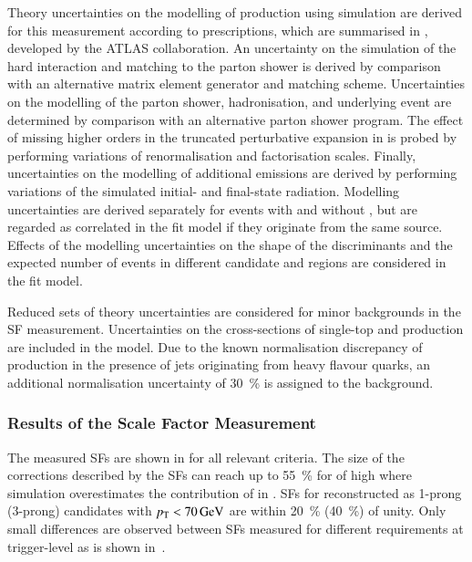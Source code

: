 Theory uncertainties on the modelling of \ttbar production using simulation are
derived for this measurement according to prescriptions, which are summarised in
, developed by the ATLAS collaboration. An
uncertainty on the simulation of the hard interaction and matching to the parton
shower is derived by comparison with an alternative matrix element generator and
matching scheme. Uncertainties on the modelling of the parton shower,
hadronisation, and underlying event are determined by comparison with an
alternative parton shower program. The effect of missing higher orders in the
truncated perturbative expansion in \alphas is probed by performing variations
of renormalisation and factorisation scales. Finally, uncertainties on the
modelling of additional emissions are derived by performing variations of the
simulated initial- and final-state radiation. Modelling uncertainties are
derived separately for \ttbar events with and without \faketauhadvis, but are
regarded as correlated in the fit model if they originate from the same
source. Effects of the \ttbar modelling uncertainties on the shape of the \mTW
discriminants and the expected number of events in different \tauhadvis
candidate \Ntracks and \pT regions are considered in the fit model.

Reduced sets of theory uncertainties are considered for minor backgrounds in the
SF measurement. Uncertainties on the cross-sections of single-top and \Vjets
production are included in the model. Due to the known normalisation discrepancy
of \Vjets production in the presence of jets originating from heavy flavour
quarks, an additional normalisation uncertainty of \SI{30}{\percent} is assigned
to the \Vjets background.


\subsubsection{Results of the Scale Factor Measurement}

The measured \faketauhadvis SFs are shown in  for
all relevant \tauid criteria. The size of the corrections described by the SFs
can reach up to \SI{55}{\percent} for \faketauhadvis of high \pT where
simulation overestimates the contribution of \faketauhadvis in \ttbar. SFs for
\faketauhadvis reconstructed as 1-prong (3-prong) candidates with
$\pT < \SI{70}{\GeV}$ are within \SI{20}{\percent} (\SI{40}{\percent}) of
unity. Only small differences are observed between SFs measured for different
\tauid requirements at trigger-level as is shown
in~.

